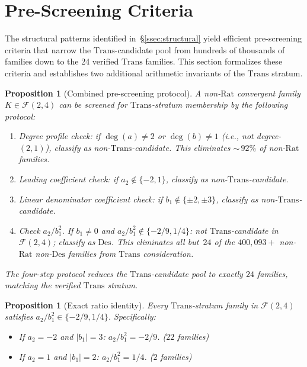 \documentclass[12pt, reqno]{amsart}
\newtheorem{proposition}[theorem]{Proposition}
\theoremstyle{definition}
\theoremstyle{remark}
\newcommand{\Rat}{\mathrm{Rat}}
\newcommand{\Trans}{\mathrm{Trans}}
\newcommand{\Des}{\mathrm{Des}}
\begin{document}
\section{Pre-Screening Criteria}\label{sec:prescreen}

The structural patterns identified in~\S\ref{ssec:structural} yield efficient pre-screening
criteria that narrow the $\Trans$-candidate pool from hundreds of thousands of
families down to the 24 verified $\Trans$ families. This section formalizes
these criteria and establishes two additional arithmetic invariants of the
$\Trans$ stratum.

\begin{proposition}[Combined pre-screening protocol]\label{prop:protocol}
A non-$\Rat$ convergent
family $K \in \mathcal{F}(2,4)$ can be screened for $\Trans$-stratum membership by the following
protocol:
\begin{enumerate}[\upshape(i)]
\item Degree profile check: if $\deg(a) \ne 2$ or $\deg(b) \ne 1$ (i.e., not degree-$(2,1)$),
     classify as non-$\Trans$-candidate. This eliminates ${\sim}\,92\%$ of non-$\Rat$ families.
\item Leading coefficient check: if $a_2 \notin \{-2, 1\}$, classify as non-$\Trans$-candidate.
\item Linear denominator coefficient check: if $b_1 \notin \{\pm 2, \pm 3\}$, classify as
      non-$\Trans$-candidate.
\item Check $a_2/b_1^2$. If $b_1 \ne 0$ and $a_2/b_1^2 \notin \{-2/9, 1/4\}$:
     not $\Trans$-candidate in $\mathcal{F}(2,4)$; classify as $\Des$.
     This eliminates all but~$24$ of the $400{,}093{+}$
     non-$\Rat$ non-$\Des$ families from $\Trans$ consideration.
\end{enumerate}
The four-step protocol reduces the $\Trans$-candidate pool to exactly $24$ families,
matching the verified $\Trans$ stratum.
\end{proposition}

\begin{proposition}[Exact ratio identity]\label{prop:exactratio}
Every $\Trans$-stratum family in $\mathcal{F}(2,4)$ satisfies
$a_2/b_1^2 \in \{-2/9, 1/4\}$. Specifically:
\begin{itemize}
\item If $a_2 = -2$ and $|b_1| = 3$: $a_2/b_1^2 = -2/9$. ($22$ families)
\item If $a_2 = 1$ and $|b_1| = 2$: $a_2/b_1^2 = 1/4$. ($2$ families)
\end{itemize}
\end{proposition}
\end{document}

